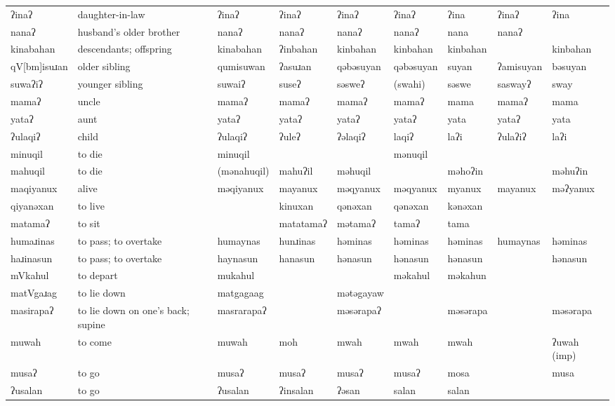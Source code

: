 \begin{landscape}
\begin{longtable}{*{9}{p{}}}
\text{*}ʔinaʔ & daughter-in-law & ʔinaʔ & ʔinaʔ & ʔinaʔ & ʔinaʔ & ʔina & ʔinaʔ & ʔina\\
\text{*}nanaʔ & husband's older brother & nanaʔ & nanaʔ & nanaʔ & nanaʔ & nana & nanaʔ & \\
\text{*}kinabahan & descendants; offspring & kinabahan & ʔinbahan & kinbahan & kinbahan & kinbahan &  & kinbahan\\
\text{*}qV[bm]isuɹan & older sibling & qumisuwan & ʔasuɹan & qəbəsuyan & qəbəsuyan & suyan & ʔamisuyan & bəsuyan\\
\text{*}suwaʔiʔ & younger sibling & suwaiʔ & suseʔ & səsweʔ & (swahi) & səswe & saswayʔ & sway\\
\text{*}mamaʔ & uncle & mamaʔ & mamaʔ & mamaʔ & mamaʔ & mama & mamaʔ & mama\\
\text{*}yataʔ & aunt & yataʔ & yataʔ & yataʔ & yataʔ & yata & yataʔ & yata\\
\text{*}ʔulaqiʔ & child & ʔulaqiʔ & ʔuleʔ & ʔəlaqiʔ & laqiʔ & laʔi & ʔulaʔiʔ & laʔi\\
\text{*}minuqil & to die & minuqil &  &  & mənuqil &  &  & \\
\text{*}mahuqil & to die & (mənahuqil) & mahuʔil & məhuqil &  & məhoʔin &  & məhuʔin\\
\text{*}maqiyanux & alive & məqiyanux & mayanux & məqyanux & məqyanux & myanux & mayanux & məʔyanux\\
\text{*}qiyanəxan & to live &  & kinuxan & qənəxan & qənəxan & kənəxan &  & \\
\text{*}matamaʔ & to sit &  & matatamaʔ & mətamaʔ & tamaʔ & tama &  & \\
\text{*}humaɹinas & to pass; to overtake & humaynas & hunɹinas & həminas & həminas & həminas & humaynas & həminas\\
\text{*}haɹinasun & to pass; to overtake & haynasun & hanasun & hənasun & hənasun & hənasun &  & hənasun\\
\text{*}mVkahul & to depart & mukahul &  &  & məkahul & məkahun &  & \\
\text{*}matVgaɹag & to lie down & matgagaag &  & mətəgayaw &  &  &  & \\
\text{*}masirapaʔ & to lie down on one's back; supine & masrarapaʔ &  & məsərapaʔ &  & məsərapa &  & məsərapa\\
\text{*}muwah & to come & muwah & moh & mwah & mwah & mwah &  & ʔuwah (imp)\\
\text{*}musaʔ & to go & musaʔ & musaʔ & musaʔ & musaʔ & mosa &  & musa\\
\text{*}ʔusalan & to go & ʔusalan & ʔinsalan & ʔəsan & salan & salan &  & \\

\end{longtable}
\end{landscape}
